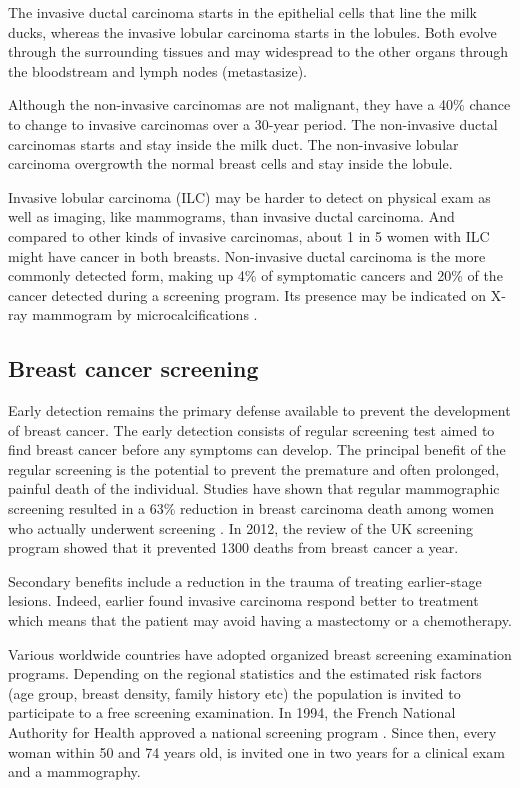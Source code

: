 The invasive ductal carcinoma starts in the epithelial cells that line the milk ducks, whereas the invasive lobular carcinoma starts in the lobules. Both evolve through the surrounding tissues and may widespread to the other organs through the bloodstream and lymph nodes (metastasize). 

Although the non-invasive carcinomas are not malignant, they have a 40\% chance to change to invasive carcinomas over a 30-year period. The non-invasive ductal carcinomas starts and stay inside the milk duct. The non-invasive lobular carcinoma overgrowth the normal breast cells and stay inside the lobule. 

Invasive lobular carcinoma (ILC)  may be harder to detect on physical exam as well as imaging, like mammograms, than invasive ductal carcinoma. And compared to other kinds of invasive carcinomas, about 1 in 5 women with ILC might have cancer in both breasts.  Non-invasive ductal carcinoma is the more commonly detected form, making up 4\% of symptomatic cancers and 20\% of the cancer detected during a screening program. Its presence may be indicated on X-ray mammogram by microcalcifications \citep{acs_cancer_2017}.
 
\subsection{Breast cancer screening}\label{subsection:cancerscrenning}
Early detection remains the primary defense available to prevent the development of breast cancer. The early detection consists of regular screening test aimed to find breast cancer before any symptoms can develop.  The principal benefit of the regular screening is the potential to prevent the premature and often prolonged, painful death of the individual. Studies have shown that regular mammographic screening resulted in a $63\%$ reduction in breast carcinoma death among women who actually underwent screening \citep{tabar_beyond_2001}. In 2012, the review of the UK screening program \citep{NHSBSP_2012} showed that it prevented 1300 deaths from breast cancer a year. 

Secondary benefits include a reduction in the trauma of treating earlier-stage lesions. Indeed, earlier found invasive carcinoma respond better to treatment which means that the patient may avoid having a mastectomy or a chemotherapy.

Various worldwide countries have adopted organized breast screening examination programs. Depending on the regional statistics and the estimated risk factors (age group, breast density, family history etc) the population is invited to participate to a free screening examination. In 1994, the French National Authority for Health approved a national screening program \citep{HAS_2016}. Since then, every woman within 50 and 74 years old, is invited one in two years for a clinical exam and a mammography.

